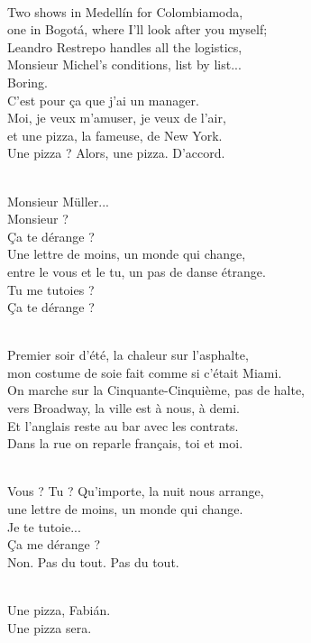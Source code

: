\begin{lyrics}
\\
Two shows in Medellín for Colombiamoda,\\
one in Bogotá, where I'll look after you myself;\\
Leandro Restrepo handles all the logistics,\\
Monsieur Michel's conditions, list by list...
\\
Boring.\\
C'est pour ça que j'ai un manager.\\
Moi, je veux m'amuser, je veux de l'air,\\
et une pizza, la fameuse, de New York.
\\
Une pizza ? Alors, une pizza. D'accord.

\\
Monsieur Müller...
\\
Monsieur ?
\\
Ça te dérange ?
\\
Une lettre de moins, un monde qui change,\\
entre le vous et le tu, un pas de danse étrange.
\\
Tu me tutoies ?
\\
Ça te dérange ?

\\
Premier soir d'été, la chaleur sur l'asphalte,\\
mon costume de soie fait comme si c'était Miami.
\\
On marche sur la Cinquante-Cinquième, pas de halte,\\
vers Broadway, la ville est à nous, à demi.
\\
Et l'anglais reste au bar avec les contrats.
\\
Dans la rue on reparle français, toi et moi.

\\
Vous ? Tu ? Qu'importe, la nuit nous arrange,\\
une lettre de moins, un monde qui change.
\\
Je te tutoie...
\\
Ça me dérange ?
\\
Non. Pas du tout. Pas du tout.

\\
Une pizza, Fabián.
\\
Une pizza sera.
\end{lyrics}

